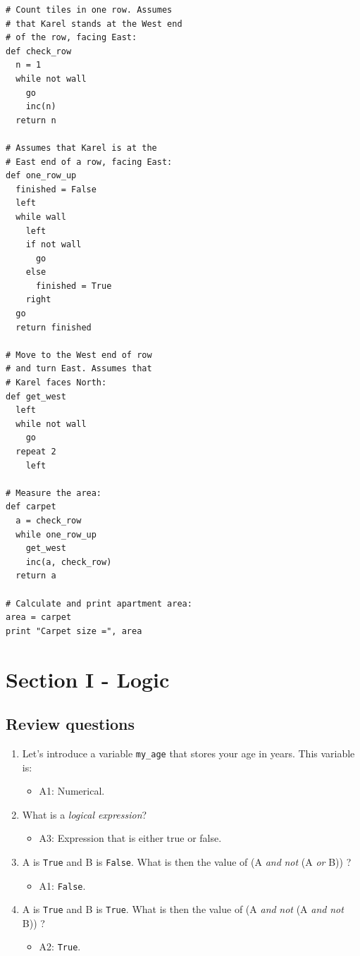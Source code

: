 \documentclass[article,A4,12pt]{llncs}
\begin{document}
\begin{verbatim}
# Count tiles in one row. Assumes
# that Karel stands at the West end 
# of the row, facing East: 
def check_row
  n = 1
  while not wall
    go 
    inc(n)
  return n
  
# Assumes that Karel is at the 
# East end of a row, facing East:
def one_row_up
  finished = False
  left
  while wall
    left
    if not wall 
      go
    else 
      finished = True 
    right
  go
  return finished

# Move to the West end of row 
# and turn East. Assumes that 
# Karel faces North:
def get_west
  left
  while not wall
    go
  repeat 2
    left
  
# Measure the area:
def carpet
  a = check_row
  while one_row_up
    get_west
    inc(a, check_row)
  return a
  
# Calculate and print apartment area:
area = carpet
print "Carpet size =", area
\end{verbatim}


\section{Section I - Logic}

\subsection{Review questions}

\begin{enumerate}
\item Let's introduce a variable {\tt my\_age} that stores your age in years.
      This variable is:
  \begin{itemize}
    \item A1: Numerical.
  \end{itemize}
\item What is a {\em logical expression}? 
  \begin{itemize}
    \item A3: Expression that is either true or false.
  \end{itemize}
\item A is {\tt True} and B is {\tt False}. What is then the value of (A {\em and} {\em not} (A {\em or} B)) ?
  \begin{itemize}
    \item A1: {\tt False}.
  \end{itemize}
\item A is {\tt True} and B is {\tt True}. What is then the value of (A {\em and} {\em not} (A {\em and} {\em not} B)) ?
  \begin{itemize}
    \item A2: {\tt True}.
  \end{itemize}
\end{enumerate}
\end{document}
